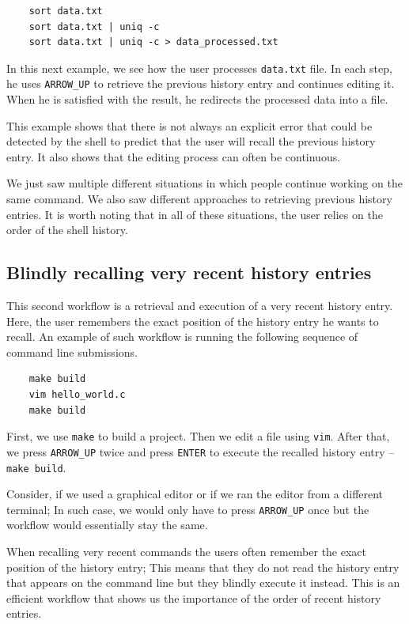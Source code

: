 \begin{verbatim}
    sort data.txt
    sort data.txt | uniq -c
    sort data.txt | uniq -c > data_processed.txt
\end{verbatim}

In this next example, we see how the user processes \verb|data.txt| file. In each step, he uses \verb|ARROW_UP| to retrieve the previous history entry and continues editing it. When he is satisfied with the result, he redirects the processed data into a file. 

This example shows that there is not always an explicit error that could be detected by the shell to predict that the user will recall the previous history entry. It also shows that the editing process can often be continuous.

We just saw multiple different situations in which people continue working on the same command. We also saw different approaches to retrieving previous history entries. It is worth noting that in all of these situations, the user relies on the order of the shell history. 

\subsection{Blindly recalling very recent history entries}

This second workflow is a retrieval and execution of a very recent history entry. Here, the user remembers the exact position of the history entry he wants to recall. An example of such workflow is running the following sequence of command line submissions.
\begin{verbatim}
    make build
    vim hello_world.c
    make build
\end{verbatim}
First, we use \verb|make| to build a project. Then we edit a file using \verb|vim|. After that, we press \verb|ARROW_UP| twice and press \verb|ENTER| to execute the recalled history entry -- \verb|make build|. 


Consider, if we used a graphical editor or if we ran the editor from a different terminal; In such case, we would only have to press \verb|ARROW_UP| once but the workflow would essentially stay the same.

When recalling very recent commands the users often remember the exact position of the history entry; This means that they do not read the history entry that appears on the command line but they blindly execute it instead. This is an efficient workflow that shows us the importance of the order of recent history entries.

